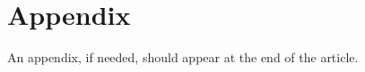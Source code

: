 \documentclass{layout/tudelft-aiaa}
\begin{document}

\renewcommand{\bibpreamble}{For a full documentation of the references, please refer to the sample.bib file. You can delete this text/command safely in main.tex at line 73. \cite{example-article,example-article-published-online,example-inbook,example-inbook-series-with-editor,example-inproceedings,example-proceedings,example-report,example-paper,example-phdthesis}}




\section*{Appendix}

An appendix, if needed, should appear at the end of the article.
\end{document}
